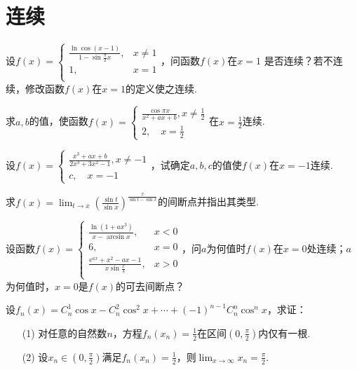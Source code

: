 


\section{连续}
\begin{xiti}
	\item 设$f\left(x\right)=\left\{\begin{matrix}
	\frac{\ln\cos\left(x-1\right)}{1-\sin\frac{\pi}{2}x},&		x\ne 1\\
	1,&		x=1\\
	\end{matrix}\right. $，问函数$f(x)$在$x=1$
	是否连续？若不连续，修改函数$f(x)$在$x=1$的定义使之连续.
	\item 求$a,b$的值，使函数$f ( x ) = \left\{ \begin{array} { l } { \frac { \cos \pi x } { x ^ { 2 } + a x + b } , x \neq \frac { 1 } { 2 } } \\ { 2 , \quad x = \frac { 1 } { 2 } } \end{array} \right.$在$x=\frac{1}{2}$连续.
	\item 设$f ( x ) = \left\{ \begin{array} { c } { \frac { x ^ { 3 } + a x + b } { 2 x ^ { 3 } + 3 x ^ { 2 } - 1 } , x \neq - 1 } \\ { c , \quad x = - 1 } \end{array} \right.$，试确定$a,b,c$的值使$f(x)$在$x=-1$连续.
	\item 求$f ( x ) = \lim _ { t \rightarrow x } \left( \frac { \sin t } { \sin x } \right) ^ { \frac { x } { \sin t - \sin x } }$的间断点并指出其类型.
	\item 设函数$f\left(x\right)=\left\{\begin{matrix}
	\frac{\ln\left(1+ax^3\right)}{x-\arcsin x},&		x<0\\
	6,&		x=0\\
	\frac{\textrm{e}^{ax}+x^2-ax-1}{x\sin\frac{x}{4}},&		x>0\\
	\end{matrix}\right. $，问$a$为何值时$f(x)$在$x=0$处连续；$a$为何值时，$x=0$是$f(x)$的可去间断点？
	\item 设$f_n\left(x\right)=C_{n}^{1}\cos x-C_{n}^{2}\cos^2x+\cdots +\left(-1\right)^{n-1}C_{n}^{n}\cos^nx$，求证：
	\begin{enumerate}
		\item [(1)] 对任意的自然数$n$，方程$f _ { n } \left( x _ { n } \right) = \frac { 1 } { 2 }$在区间$(0,\frac{\pi }{2})$内仅有一根.
		\item [(2)] 设$x _ { n } \in \left( 0 , \frac { \pi } { 2 } \right)$满足$f _ { n } \left( x _ { n } \right) = \frac { 1 } { 2 }$，则$\lim _ { x \rightarrow \infty } x _ { n } = \frac { \pi } { 2 }$.

\end{enumerate}
\end{xiti}
